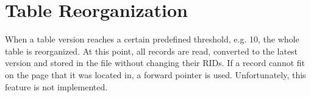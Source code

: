 \documentclass[a4paper,12pt]{article}
\begin{document}
\section{Table Reorganization}
When a table version reaches a certain predefined threshold, e.g. 10, the whole table is reorganized. At this point, all records are read, converted to the latest version and stored in the file without changing their RIDs. If a record cannot fit on the page that it was located in, a forward pointer is used. Unfortunately, this feature is not implemented.
 
\end{document}
